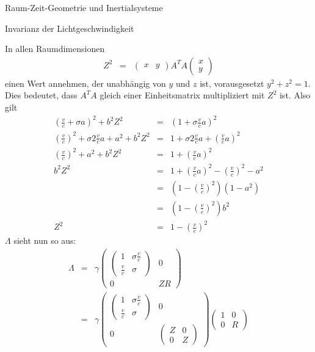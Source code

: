 \begin{chapter}{\titlestr}
\begin{section}{Raum-Zeit-Geometrie und Inertialsysteme}
\begin{subsection}{Invarianz der Lichtgeschwindigkeit}
\begin{subsubsection}{In allen Raumdimensionen}
\begin{eqnarray*}
Z^2 &=& \begin{pmatrix}
x&y
\end{pmatrix}
A^TA\begin{pmatrix}
x\\y
\end{pmatrix}
\end{eqnarray*}
einen Wert annehmen, der unabhängig von $y$ und $z$ ist, vorausgesetzt $y^2+z^2=1$.
Dies bedeutet, dass $A^TA$ gleich einer Einheitsmatrix multipliziert mit $Z^2$ ist. Also gilt
\begin{eqnarray*}
\left(\frac{v}{c}+\sigma a\right)^2+b^2
Z^2&=&
\left(1+\sigma\frac{v}{c}a\right)^2\\
\left(\frac{v}{c}\right)^2+\sigma2\frac{v}{c}a+a^2+b^2
Z^2&=&
1+\sigma2\frac{v}{c}a+\left(\frac{v}{c}a\right)^2\\
\left(\frac{v}{c}\right)^2+a^2+b^2
Z^2&=&
1+\left(\frac{v}{c}a\right)^2\\
b^2
Z^2&=&
1+\left(\frac{v}{c}a\right)^2-\left(\frac{v}{c}\right)^2-a^2\\
&=& \left(1-\left(\frac{v}{c}\right)^2\right)\left(1-a^2\right)\\
&=& \left(1-\left(\frac{v}{c}\right)^2\right)b^2\\
Z^2 &=& 1-\left(\frac{v}{c}\right)^2
\end{eqnarray*}
$\Lambda$ sieht nun so aus:
\begin{eqnarray*}
\Lambda &=&
\gamma
\begin{pmatrix}
\begin{pmatrix}
1 & \sigma\frac{v}{c}\\
\frac{v}{c} & \sigma
\end{pmatrix} & 0\\
0 & ZR
\end{pmatrix}\\
&=&\gamma
\begin{pmatrix}
\begin{pmatrix}
1 & \sigma\frac{v}{c}\\
\frac{v}{c} & \sigma
\end{pmatrix} & 0\\
0 & \begin{pmatrix}
Z & 0\\
0 & Z
\end{pmatrix}
\end{pmatrix}
\begin{pmatrix}
1 & 0\\
0 & R
\end{pmatrix}

\end{eqnarray*}
\end{subsubsection}
\end{subsection}
\end{section}
\end{chapter}
